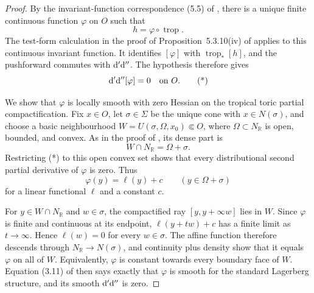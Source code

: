 \begin{proof}
By the invariant-function correspondence (5.5) of \cite{BGJKK25}, there is
a unique finite continuous function $\varphi$ on $O$ such that
\[
                         h=\varphi\circ\operatorname{trop}.
\]
The test-form calculation in the proof of Proposition~5.3.10(iv) of
\cite{BGJKK25} applies to this continuous invariant function.  It identifies
$[\varphi]$ with $\operatorname{trop}_*[h]$, and the pushforward commutes
with $\mathrm d'\mathrm d''$.  The hypothesis therefore gives
\[
                         \mathrm d'\mathrm d''[\varphi]=0\quad\hbox{on }O.
\tag{*}\label{eq:p062-invariant-toric-boundary-zero-hessian}
\]

We show that $\varphi$ is locally smooth with zero Hessian on the tropical
toric partial compactification.  Fix $x\in O$, let $\sigma\in\Sigma$ be the
unique cone with $x\in N(\sigma)$, and choose a basic neighbourhood
$W=U(\sigma,\Omega,x_0)\Subset O$, where $\Omega\subset N_{\mathbb R}$ is
open, bounded, and convex.  As in the proof of
\cite[Theorem~3.1.4]{BGJKK25}, its dense part is
\[
                         W\cap N_{\mathbb R}=\Omega+\sigma.
\]
Restricting (*) to this open convex set shows that every distributional
second partial derivative of $\varphi$ is zero.  Thus
\[
                         \varphi(y)=\ell(y)+c
                         \qquad(y\in\Omega+\sigma)
\]
for a linear functional $\ell$ and a constant $c$.

For $y\in W\cap N_{\mathbb R}$ and $w\in\sigma$, the compactified ray
$[y,y+\infty w]$ lies in $W$.  Since $\varphi$ is finite and continuous at
its endpoint, $\ell(y+tw)+c$ has a finite limit as $t\to\infty$.  Hence
$\ell(w)=0$ for every $w\in\sigma$.  The affine function therefore descends
through $N_{\mathbb R}\to N(\sigma)$, and continuity plus density show that
it equals $\varphi$ on all of $W$.  Equivalently, $\varphi$ is constant
towards every boundary face of $W$.  Equation (3.11) of \cite{BGJKK25} then
says exactly that $\varphi$ is smooth for the standard Lagerberg structure,
and its smooth $\mathrm d'\mathrm d''$ is zero.


\end{proof}
